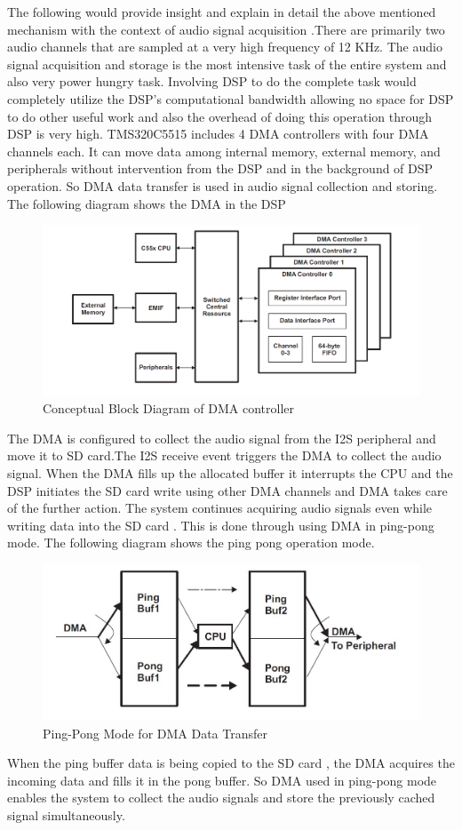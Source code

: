  The following would provide insight and explain in detail the above mentioned mechanism with the context of audio signal acquisition .There are primarily two audio channels that are sampled at a very high frequency of 12 KHz. The audio signal acquisition and storage is the most intensive task of the entire system and also very power hungry task. Involving DSP to do the complete task would completely utilize the DSP's computational bandwidth allowing no space for DSP to do other useful work and also the overhead of doing this operation through DSP is very high.  TMS320C5515 includes 4 DMA controllers with four DMA channels each. It can move data among internal memory, external memory, and peripherals without intervention from the DSP and in the background of DSP operation. So DMA data transfer is used in audio signal collection and storing.  The following diagram shows the DMA in the DSP 
 \begin{figure}[h]
 	\centering
 	\includegraphics[scale = 0.5 ]{DMA_overview.JPG}
 	\caption{Conceptual Block Diagram of DMA controller\label{DMA_Architecture}}
 \end{figure} 
 The DMA is configured to collect the audio signal from the I2S peripheral and move it to SD card.The I2S receive event triggers the DMA to collect the audio signal. When the DMA fills up the allocated buffer it interrupts the CPU and the DSP initiates the SD card write using  other DMA channels and DMA takes care of the further action. The system continues acquiring audio signals even while writing data into the SD card . This is done through using DMA in ping-pong mode. The following diagram shows the ping pong operation mode.
  \begin{figure}[h]
 	\centering
 	\includegraphics[scale = 0.5 ]{ping_pong.JPG}
 	\caption{Ping-Pong Mode for DMA Data Transfer\label{ping_pong}}
 \end{figure}
 When the ping buffer data is being copied to the SD card , the DMA acquires the incoming data and fills it in the pong buffer. So DMA used in ping-pong mode enables the system to collect the audio signals and store the previously cached signal simultaneously. 
 
